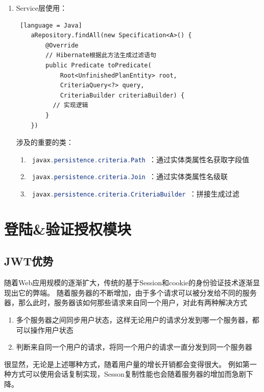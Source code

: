 \begin{enumerate}
\begin{enumerate}
              \item Service层使用：
                    \begin{lstlisting} [language = Java]
    aRepository.findAll(new Specification<A>() {
        @Override
        // Hibernate根据此方法生成过滤语句
        public Predicate toPredicate(
            Root<UnfinishedPlanEntity> root, 
            CriteriaQuery<?> query, 
            CriteriaBuilder criteriaBuilder) {
          // 实现逻辑
        }
    })             
\end{lstlisting}
                    涉及的重要的类：
                    \begin{enumerate}
                        \item \lstinline[language = Java]| javax.persistence.criteria.Path |：通过实体类属性名获取字段值
                        \item \lstinline[language = Java]| javax.persistence.criteria.Join |：通过实体类属性名级联
                        \item \lstinline[language = Java]| javax.persistence.criteria.CriteriaBuilder |：拼接生成过滤
                    \end{enumerate}
          \end{enumerate}
\end{enumerate}

\section{登陆\&验证授权模块}

\subsection{JWT优势}

随着Web应用规模的逐渐扩大，传统的基于Session和cookie的身份验证技术逐渐显现出它的弊端。
随着服务器的不断增加，由于多个请求可以被分发给不同的服务器，那么此时，服务器该如何那些请求来自同一个用户，对此有两种解决方式
\begin{enumerate}
    \item 多个服务器之间同步用户状态，这样无论用户的请求分发到哪一个服务器，都可以操作用户状态
    \item 判断来自同一个用户的请求，将同一个用户的请求一直分发到同一个服务器
\end{enumerate}
很显然，无论是上述哪种方式，随着用户量的增长开销都会变得很大。
例如第一种方式可以使用会话复制实现，Sesson复制性能也会随着服务器的增加而急剧下降。\cite{.2019h}

